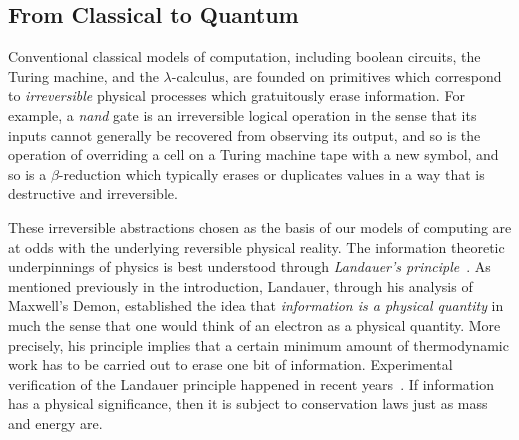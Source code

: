 \documentclass{article}
\newcommand{\jc}[1]{\fbox{Jacques says:} \textbf{#1}}
\begin{document}
\begin{comment}
\jc{The reason I commented this out is that it is under-justified. The
reader will simply not understand what these next few lines are really
saying.}
Indeed one should take the physical principles underlying quantum mechanics,
the most successful physical theory known to us and adapt computation to
``learn'' from these principles. To illustrate the depth of our crisis, Scott
Aaronson, Umesh Vazirani, and others have proposed the following puzzle.

One of these wild claims must be true!:
\begin{itemize}
\item the extended Church-Turing thesis is false, or
\item quantum physics is false, or
\item there is an efficient classical algorithm for factoring
\end{itemize}
Indeed, if quantum physics is correct then there is an efficient quantum
algorithm for factoring (Shor). If there is no efficient classical algorithm
for factoring then the extended Church-Turing thesis is false.
\end{comment}

\subsection{From Classical to Quantum}

Conventional classical models of computation, including boolean
circuits, the Turing machine, and the $\lambda$-calculus, are founded on
primitives which correspond to \emph{irreversible} physical processes which
gratuitously erase information.  For example, a \emph{nand} gate is an
irreversible logical operation in the sense that its inputs cannot generally
be recovered from observing its output, and so is the operation of overriding
a cell on a Turing machine tape with a new symbol, and so is a
$\beta$-reduction which typically erases or duplicates values in a way that
is destructive and irreversible.

These irreversible abstractions chosen as the basis of our
models of computing are at odds with the underlying
reversible physical reality. The information theoretic underpinnings
of physics is best understood through \emph{Landauer's
principle}~\cite{Landauer:1961}. As mentioned previously in the
introduction, Landauer, through his analysis of
Maxwell's Demon, established the idea that \emph{information is a
physical quantity} in much the sense that one would think of an
electron as a physical quantity. More precisely, his principle implies
that a certain minimum amount of
thermodynamic work has to be carried out to erase one bit of
information. Experimental verification of the Landauer principle
happened in recent years~\cite{berut2012experimental}. If information
has a physical significance, then it is subject to conservation laws
just as mass and energy are.
\end{document}
